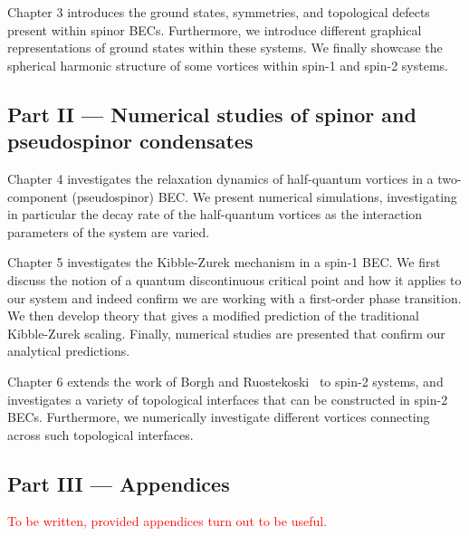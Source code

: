 Chapter 3 introduces the ground states, symmetries, and topological defects
present within spinor BECs.
Furthermore, we introduce different graphical representations of ground states
within these systems.
We finally showcase the spherical harmonic structure of some vortices within
spin-1 and spin-2 systems.

\subsection*{Part II --- Numerical studies of spinor and pseudospinor
    condensates}
Chapter 4 investigates the relaxation dynamics of half-quantum vortices in a
two-component (pseudospinor) BEC\@.
We present numerical simulations, investigating in particular the decay rate of
the half-quantum vortices as the interaction parameters of the system are
varied.

Chapter 5 investigates the Kibble-Zurek mechanism in a spin-1 BEC\@.
We first discuss the notion of a quantum discontinuous critical point and how it
applies to our system and indeed confirm we are working with a first-order phase
transition.
We then develop theory that gives a modified prediction of the traditional
Kibble-Zurek scaling.
Finally, numerical studies are presented that confirm our analytical
predictions.

Chapter 6 extends the work of Borgh and Ruostekoski~\cite{Borgh2012, Borgh2013,
    Borgh2014} to spin-2 systems, and investigates a variety of topological
interfaces that can be constructed in spin-2 BECs.
Furthermore, we numerically investigate different vortices connecting across
such topological interfaces.

\subsection*{Part III --- Appendices}
\textcolor{red}{To be written, provided appendices turn out to be useful.}
